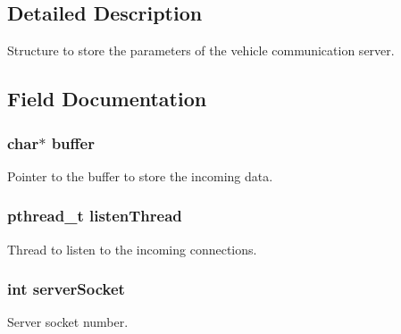 \subsection{Detailed Description}
Structure to store the parameters of the vehicle communication server. 

\subsection{Field Documentation}
\subsubsection[{\texorpdfstring{buffer}{buffer}}]{\setlength{\rightskip}{0pt plus 5cm}char$\ast$ buffer}\hypertarget{struct_v_s_c___s_t_a_t_aff2566f4c366b48d73479bef43ee4d2e}{}\label{struct_v_s_c___s_t_a_t_aff2566f4c366b48d73479bef43ee4d2e}


Pointer to the buffer to store the incoming data. 

\subsubsection[{\texorpdfstring{listen\+Thread}{listenThread}}]{\setlength{\rightskip}{0pt plus 5cm}pthread\+\_\+t listen\+Thread}\hypertarget{struct_v_s_c___s_t_a_t_a25ed3dd1e477db634fc901c587d710a7}{}\label{struct_v_s_c___s_t_a_t_a25ed3dd1e477db634fc901c587d710a7}


Thread to listen to the incoming connections. 

\subsubsection[{\texorpdfstring{server\+Socket}{serverSocket}}]{\setlength{\rightskip}{0pt plus 5cm}int server\+Socket}\hypertarget{struct_v_s_c___s_t_a_t_a106cd1d02a334c78f546d2897a1b939c}{}\label{struct_v_s_c___s_t_a_t_a106cd1d02a334c78f546d2897a1b939c}


Server socket number. 

